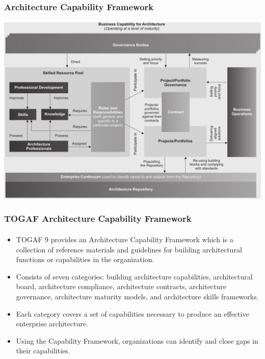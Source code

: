 \documentclass[aspectratio=169, table]{beamer}
\begin{document}
    {
        \begin{frame}
            \frametitle{Architecture Capability Framework}
            \framesubtitle{\hspace{1cm}}
            \begin{center}
                \includegraphics[width=.80\textwidth]{../figures/architecture_capability_framework}
            \end{center}
        \end{frame}
    }

    \begin{frame}
        \frametitle{TOGAF Architecture Capability Framework}
        \framesubtitle{\hspace{1cm}}
        \vspace{20pt}
        \begin{itemize}
            \item TOGAF 9 provides an Architecture Capability Framework which is a collection of reference materials and guidelines for building architectural functions
            or capabilities in the organization.
            \item Consists of seven categories: building architecture capabilities, architectural board, architecture compliance, architecture contracts, architecture governance, architecture maturity models, and architecture skills frameworks.
            \item Each category covers a set of capabilities necessary to produce an effective enterprise architecture.
            \item Using the Capability Framework, organizations can identify and close gaps in their capabilities.
        \end{itemize}
    \end{frame}
\end{document}

